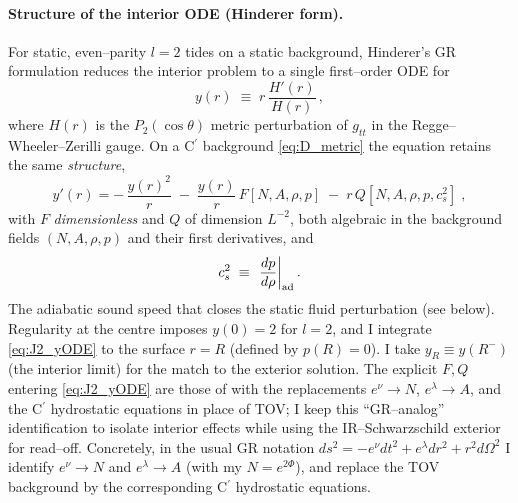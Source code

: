 \documentclass{iopjournal}
\begin{document}
\paragraph{Structure of the interior ODE (Hinderer form).}
For static, even–parity $l=2$ tides on a static background, Hinderer's GR formulation \cite{Hinderer2008,BinningtonPoisson2009,DamourNagar2009} reduces the interior problem to a single first–order ODE for
\begin{equation}
y(r)\;\equiv\;r\,\frac{H'(r)}{H(r)}\,,
\label{eq:J2_ydef}
\end{equation}
where $H(r)$ is the $P_2(\cos\theta)$ metric perturbation of $g_{tt}$ in the Regge–Wheeler–Zerilli gauge. On a C$^\prime$ background \eqref{eq:D_metric} the equation retains the same \emph{structure},
\begin{equation}
\boxed{\quad
y'(r)= -\,\frac{y(r)^2}{r} \;-\; \frac{y(r)}{r}\,F[N,A,\rho,p]
\;-\; r\,Q[N,A,\rho,p,c_s^2]\;,
\quad}
\label{eq:J2_yODE}
\end{equation}
with $F$ \emph{dimensionless} and $Q$ of dimension $L^{-2}$, both algebraic in the background fields $(N,A,\rho,p)$ and their first derivatives, and
\begin{equation}
c_s^2\;\equiv\;\left.\frac{dp}{d\rho}\right|_{\rm ad}.
\label{eq:J2_cs2_fix}
\end{equation}
The adiabatic sound speed that closes the static fluid perturbation (see below). Regularity at the centre imposes $y(0)=2$ for $l=2$, and I integrate \eqref{eq:J2_yODE} to the surface $r=R$ (defined by $p(R)=0$). I take $y_R\equiv y(R^-)$ (the interior limit) for the match to the exterior solution. The explicit $F,Q$ entering \eqref{eq:J2_yODE} are those of \cite{Hinderer2008} with the replacements $e^{\nu}\!\to N$, $e^{\lambda}\!\to A$, and the C$^\prime$ hydrostatic equations in place of TOV; I keep this ``GR–analog'' identification to isolate interior effects while using the IR–Schwarzschild exterior for read–off. Concretely, in the usual GR notation $ds^2=-e^{\nu}dt^2+e^{\lambda}dr^2+r^2d\Omega^2$ I identify
$e^{\nu}\!\to N$ and $e^{\lambda}\!\to A$ (with my $N=e^{2\Phi}$), and replace the TOV background by the corresponding C$^\prime$ hydrostatic equations.
\end{document}
